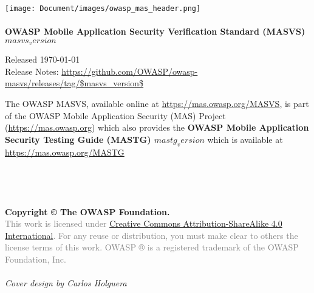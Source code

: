 \thispagestyle{empty} %

\texttt{[image: Document/images/owasp\_mas\_header.png]} \\ \\

\textbf{OWASP Mobile Application Security Verification Standard (MASVS) $masvs_version$}

Released \today \\

Release Notes: \url{https://github.com/OWASP/owasp-masvs/releases/tag/$masvs_version$}


The OWASP MASVS, available online at \url{https://mas.owasp.org/MASVS}, is part of the OWASP Mobile Application Security (MAS) Project (\url{https://mas.owasp.org}) which also provides the \textbf{OWASP Mobile Application Security Testing Guide (MASTG) $mastg_version$} which is available at \url{https://mas.owasp.org/MASTG} \\ \\ \\ \\ \\


\textbf{Copyright © The OWASP Foundation.} \\

\textcolor{gray}{This work is licensed under \href{https://creativecommons.org/licenses/by-sa/4.0/}{Creative Commons Attribution-ShareAlike 4.0 International}. For any reuse or distribution, you must make clear to others the license terms of this work.
OWASP ® is a registered trademark of the OWASP Foundation, Inc.} \\ \\


\emph{Cover design by Carlos Holguera}